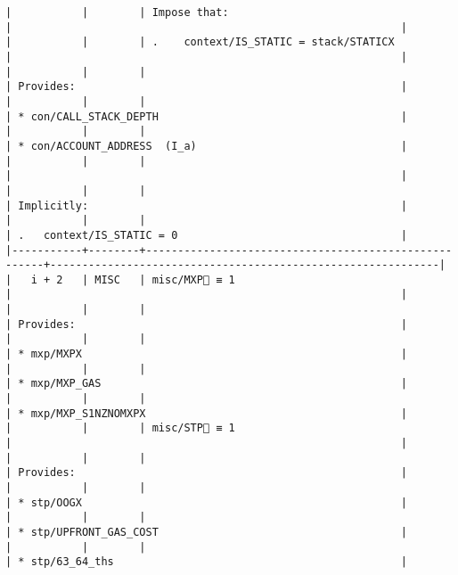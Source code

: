 \documentclass[varwidth=\maxdimen,margin=0.5cm,multi={verbatim}]{standalone}
\begin{document}
\begin{verbatim}
|           |        | Impose that:                                         |                                                             |
|           |        | .    context/IS_STATIC = stack/STATICX               |                                                             |
|           |        |                                                      | Provides:                                                   |
|           |        |                                                      | * con/CALL_STACK_DEPTH                                      |
|           |        |                                                      | * con/ACCOUNT_ADDRESS  (I_a)                                |
|           |        |                                                      |                                                             |
|           |        |                                                      | Implicitly:                                                 |
|           |        |                                                      | .   context/IS_STATIC = 0                                   |
|-----------+--------+------------------------------------------------------+-------------------------------------------------------------|
|   i + 2   | MISC   | misc/MXP🚩 ≡ 1                                       |                                                             |
|           |        |                                                      | Provides:                                                   |
|           |        |                                                      | * mxp/MXPX                                                  |
|           |        |                                                      | * mxp/MXP_GAS                                               |
|           |        |                                                      | * mxp/MXP_S1NZNOMXPX                                        |
|           |        | misc/STP🚩 ≡ 1                                       |                                                             |
|           |        |                                                      | Provides:                                                   |
|           |        |                                                      | * stp/OOGX                                                  |
|           |        |                                                      | * stp/UPFRONT_GAS_COST                                      |
|           |        |                                                      | * stp/63_64_ths                                             |

\end{verbatim}
\end{document}
